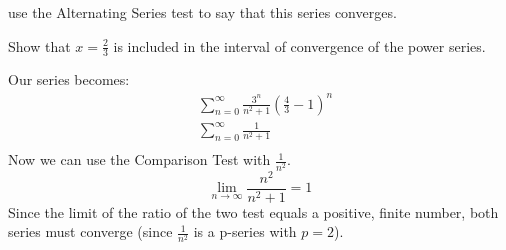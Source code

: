 \documentclass[]{article}
\begin{document}
\begin{alphenum}
    use the Alternating Series test to say that this series converges.
    \newpage 
    \item Show that $x = \frac{2}{3}$ is included in the interval of convergence of the power series.
    \par Our series becomes: 
    \begin{align*}
      &\sum_{n=0}^{\infty}\frac{3^n}{n^2+1}(\frac{4}{3}-1)^n\\  
      &\sum_{n=0}^{\infty}\frac{1}{n^2+1}\\  
    \end{align*}
    Now we can use the Comparison Test with $\frac{1}{n^2}$.
    \[\lim_{n\to\infty}\frac{n^2}{n^2+1}=1\]
    Since the limit of the ratio of the two test equals a positive, finite number,
    both series must converge (since $\frac{1}{n^2}$ is a p-series with $p=2$).
\end{alphenum}
\end{document}
